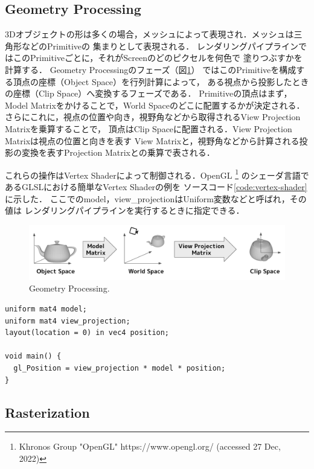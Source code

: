 \subsection*{Geometry Processing}

3Dオブジェクトの形は多くの場合，メッシュによって表現され．メッシュは三角形などのPrimitiveの
集まりとして表現される．
レンダリングパイプラインではこのPrimitiveごとに，それがScreenのどのピクセルを何色で
塗りつぶすかを計算する．
Geometry Processingのフェーズ（図\ref{fig:geometry-processing}）
ではこのPrimitiveを構成する頂点の座標（Object Space）を行列計算によって，
ある視点から投影したときの座標（Clip Space）へ変換するフェーズである．
Primitiveの頂点はまず，Model Matrixをかけることで，World Spaceのどこに配置するかが決定される．
さらにこれに，視点の位置や向き，視野角などから取得されるView Projection Matrixを乗算することで，
頂点はClip Spaceに配置される．View Projection Matrixは視点の位置と向きを表す
View Matrixと，視野角などから計算される投影の変換を表すProjection Matrixとの乗算で表される．

これらの操作はVertex Shaderによって制御される．OpenGL
\footnote{Khronos Group "OpenGL" https://www.opengl.org/ (accessed 27 Dec, 2022)}
のシェーダ言語であるGLSLにおける簡単なVertex Shaderの例を
ソースコード\ref{code:vertex-shader}に示した．
ここでのmodel，view\_projectionはUniform変数などと呼ばれ，その値は
レンダリングパイプラインを実行するときに指定できる．

\begin{figure}[htbp]
  \centering
  \includegraphics[keepaspectratio, width=\linewidth]{figures/geometry-processing.png}
  \caption{
    Geometry Processing.
  }
  \label{fig:geometry-processing}
\end{figure}

\begin{lstlisting}[caption=Vertex Shaderの例, label=code:vertex-shader]
uniform mat4 model;
uniform mat4 view_projection;
layout(location = 0) in vec4 position;

void main() {
  gl_Position = view_projection * model * position;
}
\end{lstlisting}

\subsection*{Rasterization}

